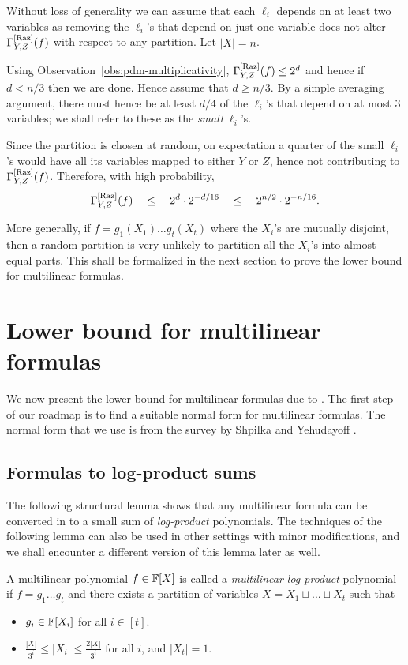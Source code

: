 \begin{proof-sketch}
Without loss of generality we can assume that each $\ell_i$ depends on at least two variables as removing the $\ell_i$'s that depend on just one variable does not alter $\Gamma^{\mathrm{[Raz]}}_{Y,Z}(f)$ with respect to any partition. Let $|X| = n$. 

Using Observation~\ref{obs:pdm-multiplicativity}, $\Gamma^{\mathrm{[Raz]}}_{Y,Z}(f) \leq 2^d$ and hence if $d < n/3$ then we are done. Hence assume that $d \geq n/3$. By a simple averaging argument, there must hence be at least $d/4$ of the $\ell_i$'s that depend on at most $3$ variables; we shall refer to these as the \emph{small} $\ell_i$'s. 

Since the partition is chosen at random, on expectation a quarter of the small $\ell_i$'s would have all its variables mapped to either $Y$ or $Z$, hence not contributing to $\Gamma^{\mathrm{[Raz]}}_{Y,Z}(f)$. Therefore, with high probability,
$$
\Gamma^{\mathrm{[Raz]}}_{Y,Z}(f) \quad \leq \quad 2^{d} \cdot 2^{-d/16} \quad \leq \quad 2^{n/2} \cdot 2^{-n/16}.
$$
\end{proof-sketch}

More generally, if $f = g_1(X_1)\dots g_t(X_t)$ where the $X_i$'s are mutually disjoint, then a random partition is very unlikely to partition all the $X_i$'s into almost equal parts. This shall be formalized in the next section to prove the lower bound for multilinear formulas. 

\section{Lower bound for multilinear formulas}
	We now present the lower bound for multilinear formulas due 
	to \cite{raz2004}. The first step of our roadmap is to find 
	a suitable normal form for multilinear formulas. The normal 
	form that we use is from the survey by Shpilka and 
	Yehudayoff \cite{sy}. 	

\subsection{Formulas to log-product sums}

The following structural lemma shows that any multilinear formula can be converted in to a small sum of \emph{log-product} polynomials. The techniques of the following lemma can also be used in other settings with minor modifications, and we shall encounter a different version of this lemma later as well.

\begin{definition}\label{defn:mult-logproduct}
  A multilinear polynomial $f\in \mathbb{F}[X]$ is called a \emph{multilinear log-product} polynomial if $f = g_1\dots g_t$ and there exists a partition of variables $X = X_1 \sqcup \dots \sqcup X_t$ such that
  \begin{itemize}
  \item $g_i \in \mathbb{F}[X_i]$ for all $i \in [t]$.
  \item $\frac{|X|}{3^i} \leq |X_i| \leq \frac{2|X|}{3^i}$ for all
    $i$, and $|X_t| = 1$.
  \end{itemize}
\end{definition}

